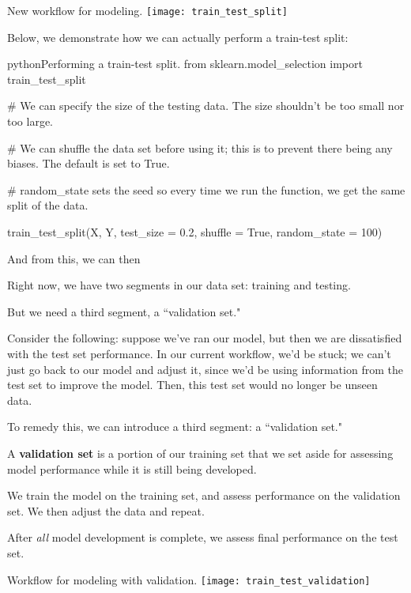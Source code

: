 \documentclass[openany]{book}
\begin{document}
\begin{figurebox}[]{New workflow for modeling.}
	\centering\texttt{[image: train\_test\_split]}
\end{figurebox}

Below, we demonstrate how we can actually perform a train-test split:
\begin{code}{python}{Performing a train-test split.}
from sklearn.model_selection import train_test_split

# We can specify the size of the testing data. The size shouldn't be too small nor too large.

# We can shuffle the data set before using it; this is to prevent there being any biases. The default is set to True.

# random_state sets the seed so every time we run the function, we get the same split of the data.

train_test_split(X, Y, test_size = 0.2, shuffle = True, random_state = 100)
\end{code}

And from this, we can then 

Right now, we have two segments in our data set: training and testing.

But we need a third segment, a ``validation set."

Consider the following: suppose we've ran our model, but then we are dissatisfied with the test set performance. In our current workflow, we'd be stuck; we can't just go back to our model and adjust it, since we'd be using information from the test set to improve the model. Then, this test set would no longer be unseen data.

To remedy this, we can introduce a third segment: a ``validation set."

\begin{defn}
	A \textbf{validation set} is a portion of our training set that we set aside for assessing model performance while it is still being developed.
	
	We train the model on the training set, and assess performance on the validation set. We then adjust the data and repeat.
	
	After \textit{all} model development is complete, we assess final performance on the test set.
\end{defn}

\begin{figurebox}[]{Workflow for modeling with validation.}
	\centering\texttt{[image: train\_test\_validation]}
\end{figurebox}
\end{document}
